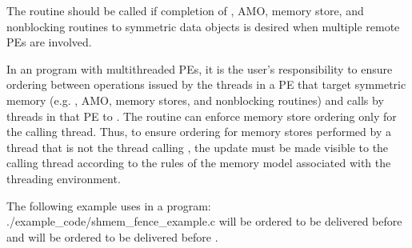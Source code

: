 \begin{apidefinition}
{    The  routine should be called if completion of \PUT{},
    \ac{AMO}, memory store, and nonblocking \PUT{} routines to symmetric data objects is desired
    when multiple remote \acp{PE} are involved.

    In an \openshmem program with multithreaded \acp{PE}, it is the
    user's responsibility to ensure ordering between operations issued by the threads
    in a \ac{PE} that target symmetric memory (e.g. \PUT{}, \ac{AMO}, memory stores,
    and nonblocking routines) and calls by threads in that \ac{PE} to
    . The  routine can enforce memory store ordering only for the
    calling thread. Thus, to ensure ordering for memory stores performed by a thread that is
    not the thread calling , the update must be made visible to the
    calling thread according to the rules of the memory model associated with
    the threading environment.
}

\begin{apiexamples}

\apicexample
    {The following example uses    in a \Cstd[11] program: }
    {./example_code/shmem_fence_example.c}
    { will be ordered to be delivered before  and 
    will be ordered to be delivered before .}

\end{apiexamples}

\end{apidefinition}
